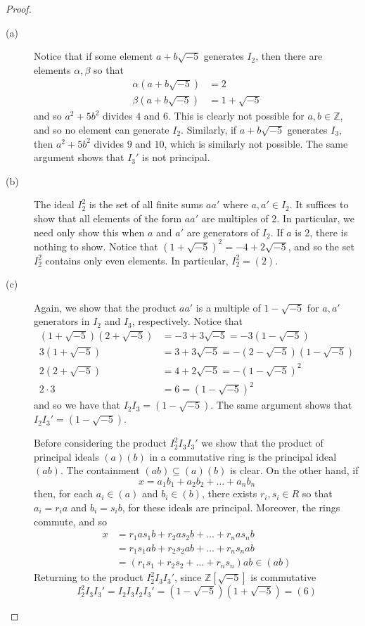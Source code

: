 \documentclass[12pt,leqno]{book}
\numberwithin{equation}{section}
\theoremstyle{definition}
\begin{document}
\begin{proof}\indent
\begin{description}
 \item [(a)] Notice that if some element $a+b\sqrt{-5}$ generates $I_2$, then there are elements $\alpha,\beta$ so that \begin{align*}\alpha(a+b\sqrt{-5})&=2\\\beta(a+b\sqrt{-5})&=1+\sqrt{-5}\end{align*} and so $a^2+5b^2$ divides $4$ and $6$. This is clearly not possible for $a,b\in\mathbb{Z}$, and so no element can generate $I_2$. Similarly, if $a+b\sqrt{-5}$ generates $I_3$, then $a^2+5b^2$ divides $9$ and $10$, which is similarly not possible. The same argument shows that $I_3'$ is not principal.
 \item [(b)] The ideal $I_2^2$ is the set of all finite sums $aa'$ where $a,a'\in I_2$. It suffices to show that all elements of the form $aa'$ are multiples of 2. In particular, we need only show this when $a$ and $a'$ are generators of $I_2$. If $a$ is 2, there is nothing to show. Notice that $(1+\sqrt{-5})^2=-4+2\sqrt{-5}$, and so the set $I_2^2$ contains only even elements. In particular, $I_2^2=(2)$.
 \item [(c)] Again, we show that the product $aa'$ is a multiple of $1-\sqrt{-5}$ for $a,a'$ generators in $I_2$ and $I_3$, respectively. Notice that \begin{align*}(1+\sqrt{-5})(2+\sqrt{-5})&=-3+3\sqrt{-5}=-3(1-\sqrt{-5})\\3(1+\sqrt{-5})&=3+3\sqrt{-5}=-(2-\sqrt{-5})(1-\sqrt{-5})\\2(2+\sqrt{-5})&=4+2\sqrt{-5}=-(1-\sqrt{-5})^2\\2\cdot3&=6=(1-\sqrt{-5})^2\end{align*} and so we have that $I_2I_3=(1-\sqrt{-5})$. The same argument shows that $I_2I_3'=(1-\sqrt{-5})$. 
 
Before considering the product $I_2^2I_3I_3'$ we show that the product of principal ideals $(a)(b)$ in a commutative ring is the principal ideal $(ab)$. The containment $(ab)\subseteq(a)(b)$ is clear. On the other hand, if \[x=a_1b_1+a_2b_2+\hdots+a_nb_n\] then, for each $a_i\in(a)$ and $b_i\in(b)$, there exists $r_i,s_i\in R$ so that $a_i=r_ia$ and $b_i=s_ib$, for these ideals are principal. Moreover, the rings commute, and so \begin{align*}x&=r_1as_1b+r_2as_2b+\hdots+r_nas_nb\\&=r_1s_1ab+r_2s_2ab+\hdots+r_ns_nab\\&=(r_1s_1+r_2s_2+\hdots+r_ns_n)ab\in(ab)\end{align*} Returning to the product $I_2^2I_3I_3'$, since $\mathbb{Z}[\sqrt{-5}]$ is commutative \[I_2^2I_3I_3'=I_2I_3I_2I_3'=(1-\sqrt{-5})(1+\sqrt{-5})=(6)\]\qedhere
\end{description}
\end{proof}
\end{document}
